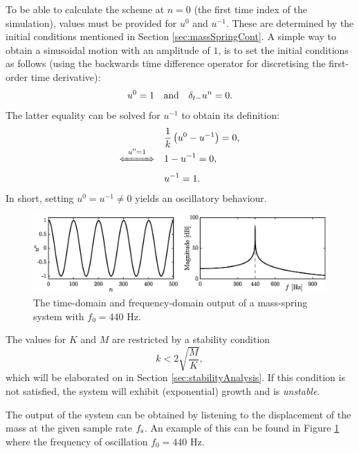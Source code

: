 To be able to calculate the scheme at $n=0$ (the first time index of the simulation), values must be provided for $u^0$ and $u^{-1}$. These are determined by the initial conditions mentioned in Section \ref{sec:massSpringCont}. A simple way to obtain a sinusoidal motion with an amplitude of $1$, is to set the initial conditions as follows (using the backwards time difference operator for discretising the first-order time derivative): 
%
\begin{equation}
    u^0 = 1 \quad \text{and} \quad \delta_{t-} u^n = 0.
\end{equation}
The latter equality can be solved for $u^{-1}$  to obtain its definition: 
\begin{align*}
    &\frac{1}{k}\left(u^0 - u^{-1}\right) = 0,\\[-1em]
    \xLeftrightarrow{\mystrut\ u^0 = 1\ }\quad &1 - u^{-1} = 0,\\[0.1em]
 &u^{-1} = 1.
\end{align*}
In short, setting $u^0 = u^{-1} \neq 0$  yields an oscillatory behaviour. 

\begin{figure}[b]
    \includegraphics[width=\textwidth]{figures/fdtd/massSpringOutput.eps}
    \caption{The time-domain and frequency-domain output of a mass-spring system with $f_0 = 440$ Hz. \label{fig:massSpringOutput}}
\end{figure}

The values for $K$ and $M$ are restricted by a stability condition
\begin{equation}
    k < 2\sqrt{\frac{M}{K}},
\end{equation}
which will be elaborated on in Section \ref{sec:stabilityAnalysis}. If this condition is not satisfied, the system will exhibit (exponential) growth and is \textit{unstable}. 

The output of the system can be obtained by listening to the displacement of the mass at the given sample rate $f_\text{s}$. An example of this can be found in Figure \ref{fig:massSpringOutput} where the frequency of oscillation $f_0 = 440$ Hz.


